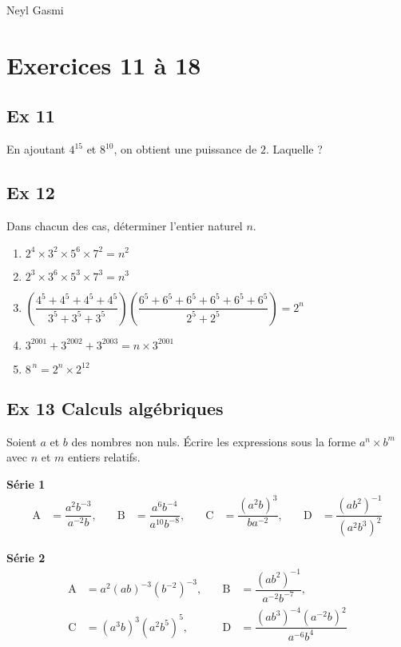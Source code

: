 \documentclass[a4paper,11pt]{article}
\begin{document}
Neyl Gasmi
\section*{Exercices 11 à 18}

\subsection*{Ex 11}
En ajoutant \(4^{15}\) et \(8^{10}\), on obtient une puissance de \(2\). Laquelle ?

\bigskip

\subsection*{Ex 12}
Dans chacun des cas, déterminer l’entier naturel \(n\).
\begin{enumerate}
  \item \(2^{4}\times 3^{2}\times 5^{6}\times 7^{2}=n^{2}\)
  \item \(2^{3}\times 3^{6}\times 5^{3}\times 7^{3}=n^{3}\)
  \item \(\left(\dfrac{4^{5}+4^{5}+4^{5}+4^{5}}{3^{5}+3^{5}+3^{5}}\right)
         \left(\dfrac{6^{5}+6^{5}+6^{5}+6^{5}+6^{5}+6^{5}}{2^{5}+2^{5}}\right)=2^{n}\)
  \item \(3^{2001}+3^{2002}+3^{2003}=n\times 3^{2001}\)
  \item \(8^{\,n}=2^{n}\times 2^{12}\)
\end{enumerate}

\bigskip

\subsection*{Ex 13 \; Calculs algébriques}
Soient \(a\) et \(b\) des nombres non nuls. Écrire les expressions sous la forme \(a^{n}\times b^{m}\) avec \(n\) et \(m\) entiers relatifs.

\medskip
\textbf{Série 1}
\[
\begin{aligned}
\mathrm{A}&=\dfrac{a^{2}b^{-3}}{a^{-2}b},
&\quad \mathrm{B}&=\dfrac{a^{6}b^{-4}}{a^{10}b^{-8}},
&\quad \mathrm{C}&=\dfrac{(a^{2}b)^{3}}{ba^{-2}},
&\quad \mathrm{D}&=\dfrac{(ab^{2})^{-1}}{(a^{2}b^{3})^{2}}
\end{aligned}
\]

\medskip
\textbf{Série 2}
\[
\begin{aligned}
\mathrm{A}&=a^{2}(ab)^{-3}(b^{-2})^{-3},
&\quad \mathrm{B}&=\dfrac{(ab^{2})^{-1}}{a^{-2}b^{-7}},\\
\mathrm{C}&=(a^{3}b)^{3}(a^{2}b^{5})^{5},
&\quad \mathrm{D}&=\dfrac{(ab^{3})^{-4}(a^{-2}b)^{2}}{a^{-6}b^{4}}
\end{aligned}
\]
\end{document}
